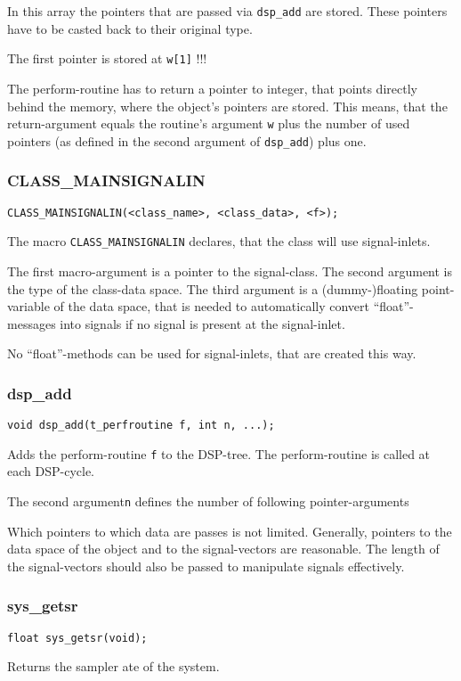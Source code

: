 \documentclass[12pt, a4paper,english,titlepage]{article}
\begin{document}
\begin{appendix}
In this array the pointers that are passed via \verb+dsp_add+ are stored.
These pointers have to be casted back to their original type.

The first pointer is stored at \verb+w[1]+ !!!

The perform-routine has to return a pointer to integer,
that points directly behind the memory, where the object's pointers are stored.
This means, that the return-argument equals the routine's argument \verb+w+
plus the number of used pointers
(as defined in the second argument of \verb+dsp_add+) plus one.

\subsubsection{CLASS\_MAINSIGNALIN}
\begin{verbatim}
CLASS_MAINSIGNALIN(<class_name>, <class_data>, <f>);
\end{verbatim}
The macro \verb+CLASS_MAINSIGNALIN+ declares,
that the class will use signal-inlets.

The first macro-argument is a pointer to the signal-class.
The second argument is the type of the class-data space.
The third argument is a (dummy-)floating point-variable of the data space,
that is needed to automatically convert ``float''-messages into signals
if no signal is present at the signal-inlet.

No ``float''-methods can be used for signal-inlets, that are created this way.

\subsubsection{dsp\_add}
\begin{verbatim}
void dsp_add(t_perfroutine f, int n, ...);
\end{verbatim}
Adds the perform-routine \verb+f+ to the DSP-tree.
The perform-routine is called at each DSP-cycle.

The second argument\verb+n+ defines the number of following pointer-arguments 

Which pointers to which data are passes is not limited.
Generally, pointers to the data space of the object and to the
signal-vectors are reasonable.
The length of the signal-vectors should also be passed to manipulate signals effectively.

\subsubsection{sys\_getsr}
\begin{verbatim}
float sys_getsr(void);
\end{verbatim}
Returns the sampler ate of the system.


\end{appendix}
\end{document}
